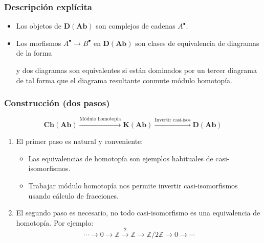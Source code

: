 \documentclass[12pt]{beamer}
\begin{document}
\begin{frame}
  \frametitle{Descripción explícita}
  \begin{itemize}
    \item Los objetos de $\mathbf{D}(\mathbf{Ab})$ son complejos de cadenas $A^{\bullet}$.
      \pause
    \item Los morfismos $A^{\bullet} \to B^{\bullet}$ en $\mathbf{D}(\mathbf{Ab})$ son clases de equivalencia de diagramas de la forma
      \begin{center}
      \end{center}
      y dos diagramas son equivalentes si están dominados por un tercer diagrama de tal forma que el diagrama resultante conmute módulo homotopía.
  \end{itemize}
\end{frame}

\begin{frame}
  \frametitle{Construcción (dos pasos)}
  \[ \mathbf{Ch}(\mathbf{Ab}) \xrightarrow{\text{Módulo homotopía}} \mathbf{K}(\mathbf{Ab}) \xrightarrow{\text{Invertir casi-isos}} \mathbf{D}(\mathbf{Ab}) \]
  \pause
  \begin{enumerate}
    \item El primer paso es natural y conveniente:
      \begin{itemize}
        \item Las equivalencias de homotopía son ejemplos habituales de casi-isomorfismos.
        \item Trabajar módulo homotopía nos permite invertir casi-isomorfismos usando cálculo de fracciones.
      \end{itemize}
      \pause
    \item El segundo paso es necesario, no todo casi-isomorfismo es una equivalencia de homotopía.
      Por ejemplo:
      \[ \cdots \to 0 \to \mathbb{Z} \xrightarrow{2} \mathbb{Z} \to \mathbb{Z}/2\mathbb{Z} \to 0 \to \cdots \]
  \end{enumerate}
\end{frame}
\end{document}
